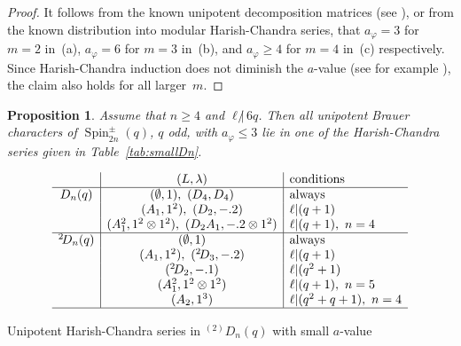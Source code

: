 \documentclass[12pt,leqno,a4paper]{amsart}
\newcommand{\Spin}{{\operatorname{Spin}}}
\newcommand{\tw}[1]{{}^{#1}\!}
\let\la=\lambda
\let\vhi=\varphi
\newtheorem{prop}[thm]{Proposition}
\theoremstyle{remark}
\begin{document}
\begin{proof}
It follows from the known unipotent decomposition matrices (see
\cite[App.~1]{Ja90}), or from the known distribution into modular
Harish-Chandra series, that $a_\vhi=3$ for $m=2$ in~(a), $a_\vhi=6$ for $m=3$
in~(b), and $a_\vhi\ge4$ for $m=4$ in~(c) respectively.
Since Harish-Chandra induction does not diminish the $a$-value (see for example
\cite[Cor.~8.7]{LuB}), the claim also holds for all larger~$m$.
\end{proof}

\begin{prop}   \label{prop:HC Dn}
 Assume that $n\ge4$ and $\ell{\not|}\,6q$. Then all unipotent Brauer characters
 of $\Spin_{2n}^\pm(q)$, $q$ odd, with $a_\vhi\le3$ lie in one of the
 Harish-Chandra series given in Table~\ref{tab:smallDn}.
\end{prop}

\begin{table}[ht]
\[\begin{array}{c|c|l}
 & (L,\la)& \text{conditions}\\
\hline
D_n(q)& (\emptyset,1),\ (D_4,D_4)& \text{always}\\
      & (A_1,1^2),\  (D_2,-.2)& \ell|(q+1)\\
      & (A_1^2,1^2\otimes 1^2),\ (D_2A_1,-.2\otimes 1^2)& \ell|(q+1),\ n=4\\
\hline
\tw2D_n(q)& (\emptyset,1)& \text{always}\\
      & (A_1,1^2),\  (\tw2D_3,-.2)& \ell|(q+1)\\
      & (\tw2D_2,-.1)& \ell|(q^2+1)\\
      & (A_1^2,1^2\otimes 1^2)& \ell|(q+1),\ n=5\\
      & (A_2,1^3)& \ell|(q^2+q+1),\ n=4\\
\hline
\end{array}\]
\caption{Unipotent Harish-Chandra series in $\tw{(2)}D_n(q)$ with small $a$-value}   \label{tab:smallDn}
\end{table}
\end{document}
